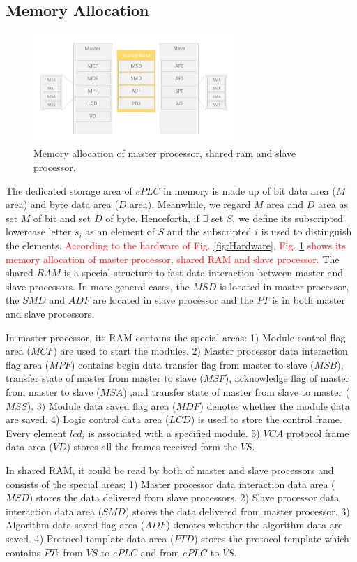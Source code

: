 \documentclass[journal,UTF8]{IEEEtran}
\begin{document}
\subsection{Memory Allocation}
\begin{figure}
	\centering
	\includegraphics[width=3in]{fig/RAM.pdf}
	\caption{Memory allocation of master processor, shared ram and slave processor.}
	\label{fig:RAM}
\end{figure}
 The dedicated storage area of $ePLC$ in memory is made up of bit data area ($M$ area) and byte data area ($D$ area). Meanwhile, we regard $M$ area and $D$ area as set $M$ of bit and set $D$ of byte. Henceforth, if $\exists$ set $S$, we define its subscripted lowercase letter $s_i$ as an element of $S$ and the subscripted $i$ is used to distinguish the elements. \textcolor{red}{According to the hardware of Fig. \ref{fig:Hardware}, Fig. \ref{fig:RAM} shows its memory allocation of master processor, shared RAM and slave processor.} The shared $RAM$ is a special structure to fast data interaction between master and slave processors. In more general cases, the $MSD$ is located in master processor, the $SMD$ and $ADF$ are located in slave processor and the $PT$ is in both master and slave processors. 

In master processor, its RAM contains the special areas: 1) Module control flag area ($MCF$) are used to start the modules. 2) Master processor data interaction flag area ($MPF$) contains begin data transfer flag from master to slave ($MSB$), transfer state of master from master to slave ($MSF$), acknowledge flag of master from master to slave ($MSA$) ,and transfer state of master from slave to master ($MSS$). 3) Module data saved flag area ($MDF$) denotes whether the module data are saved. 4) Logic control data area ($LCD$) is used to store the control frame. Every element $lcd_i$ is associated with a specified module. 5) $VCA$ protocol frame data area ($VD$) stores all the frames received form the $VS$.  

In shared RAM, it could be read by both of master and slave processors and consists of the special areas: 1) Master processor data interaction data area ($MSD$) stores the data delivered from slave processors. 2) Slave processor data interaction data area ($SMD$) stores the data delivered from master processor. 3) Algorithm data saved flag area ($ADF$) denotes whether the algorithm data are saved. 4) Protocol template data area ($PTD$) stores the protocol template which contains $PT$s from $VS$ to $ePLC$ and from $ePLC$ to $VS$.
\end{document}
